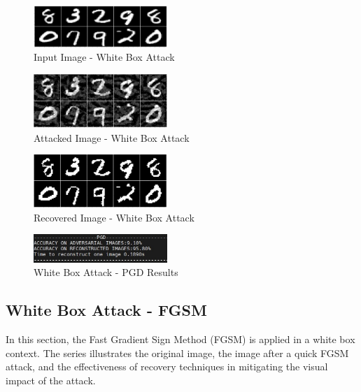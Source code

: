 \documentclass[letterpaper,twocolumn,10pt]{article}
\begin{document}
\begin{figure}[htbp]
  \centering
  \includegraphics[width=0.45\textwidth]{a.png}
  \caption{Input Image - White Box Attack}
  \label{fig:a}
\end{figure}

\begin{figure}[htbp]
  \centering
  \includegraphics[width=0.45\textwidth]{b.png}
  \caption{Attacked Image - White Box Attack}
  \label{fig:b}
\end{figure}

\begin{figure}[htbp]
  \centering
  \includegraphics[width=0.45\textwidth]{c.png}
  \caption{Recovered Image - White Box Attack}
  \label{fig:c}
\end{figure}

\begin{figure}[htbp]
  \centering
  \includegraphics[width=0.45\textwidth]{wpgd.png}
  \caption{White Box Attack - PGD Results}
  \label{fig:wpgd}
\end{figure}

\subsection{White Box Attack - FGSM}
In this section, the Fast Gradient Sign Method (FGSM) is applied in a white box context. The series illustrates the original image, the image after a quick FGSM attack, and the effectiveness of recovery techniques in mitigating the visual impact of the attack.
\end{document}
